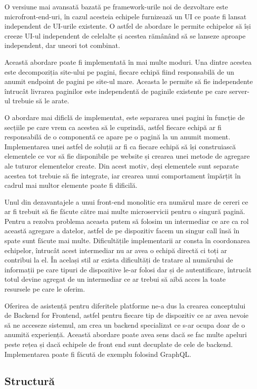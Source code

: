 O versiune mai avansată bazată pe framework-urile noi de dezvoltare este microfront-end-uri,
în cazul acesteia echipele furnizează un UI ce poate fi lansat independent de UI-urile
existente. O astfel de abordare le permite echipelor să își creeze UI-ul independent de celelalte
și acestea rămânând să se lanseze aproape independent, dar uneori tot combinat.

Această abordare poate fi implementată în mai multe moduri. Una dintre acestea este decompoziția
site-ului pe pagini, fiecare echipă fiind responsabilă de un anumit endpoint de pagini pe
site-ul mare. Aceasta le permite să fie independente întrucât livrarea paginilor este
independentă de paginile existente pe care server-ul trebuie să le arate.

O abordare mai dificlă de implementat, este separarea unei pagini în funcție de secțiile
pe care vrem ca acestea să le cuprindă, astfel fiecare echipă ar fi responsabilă de o componentă
ce apare pe o pagină la un anumit moment. Implementarea unei astfel de soluții ar fi ca
fiecare echipă să își construiască elementele ce vor să fie disponibile pe website și crearea
unei metode de agregare ale tuturor elementelor create. Din acest motiv, deși elementele sunt
separate acestea tot trebuie să fie integrate, iar crearea unui comportament împărțit
în cadrul mai multor elemente poate fi dificilă.

Unul din dezavantajele a unui front-end monolitic era numărul mare de cereri ce ar fi trebuit să
fie făcute către mai multe microservicii pentru o singură pagină. Pentru a rezolva problema aceasta
putem să folosim un intermediar ce are ca rol această agregare a datelor, astfel de pe dispozitiv
facem un singur call însă în spate sunt făcute mai multe. Dificultățile implementarii ar consta în
coordonarea echipelor, întrucât acest intermediar nu ar avea o echipă directă ci toți ar contribui la el.
În același stil ar exista dificultăți de tratare al numărului de informații pe care tipuri
de dispozitive le-ar folosi dar și de autentificare, întrucât totul devine agregat de un intermediar ce
ar trebui să aibă acces la toate resursele pe care le oferim.

Oferirea de asistență pentru diferitele platforme ne-a dus la crearea conceptului de Backend for Frontend,
astfel pentru fiecare tip de dispozitiv ce ar avea nevoie să ne acceseze sistemul,
am crea un backend specializat ce s-ar ocupa doar de o anumită experiență. Această abordare poate
avea sens dacă se fac multe apeluri peste rețea și dacă echipele de front end sunt decuplate de cele de backend.
Implementarea poate fi făcută de exemplu folosind GraphQL.

\subsection{Structură}
